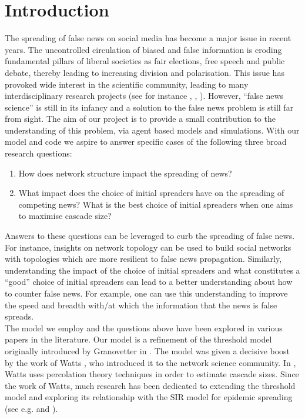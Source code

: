 \documentclass[10pt]{article}
\begin{document}

\newpage



\tableofcontents

\section{Introduction}
The spreading of false news on social media has become a major issue in recent years. The uncontrolled circulation of biased and false information is eroding fundamental pillars of liberal societies as fair elections, free speech and public debate, thereby leading to increasing division and polarisation. This issue has provoked wide interest in the scientific community, leading to many interdisciplinary research projects (see for instance \cite{del2016spreading}, \cite{vosoughi2018spread}, \cite{lazer2018science}). However, ``false news science'' is still in its infancy and a solution to the false news problem is still far from sight. The aim of our project is to provide a small contribution to the understanding of this problem, via agent based models and simulations. With our model and code we aspire to answer specific cases of the following three broad research questions:
\begin{enumerate}
\item \label{intro:q1} How does network structure impact the spreading of news?
\item \label{intro:q2} What impact does the choice of initial spreaders have on the spreading of competing news? What is the best choice of initial spreaders when one aims to maximise cascade size? 
\end{enumerate}
Answers to these questions can be leveraged to curb the spreading of false news. For instance, insights on network topology can be used to build social networks with topologies which are more resilient to false news propagation. Similarly, understanding the impact of the choice of initial spreaders and what constitutes a ``good'' choice of initial spreaders can lead to a better understanding about how to counter false news. For example, one can use this understanding to improve the speed and breadth with/at which the information that the news is false spreads. \\

The model we employ and the questions above have been explored in various papers in the literature. Our model is a refinement of the threshold model originally introduced by Granovetter in \cite{granovetter1978threshold}. The model was given a decisive boost by the work of Watts \cite{watts2002simple}, who introduced it to the network science community. In \cite{watts2002simple}, Watts uses percolation theory techniques in order to estimate cascade sizes. Since the work of Watts, much research has been dedicated to extending the threshold model and exploring its relationship with the SIR model for epidemic spreading (see e.g. \cite{ran2020generalized} and \cite{dodds2004universal}). \\
\end{document}
